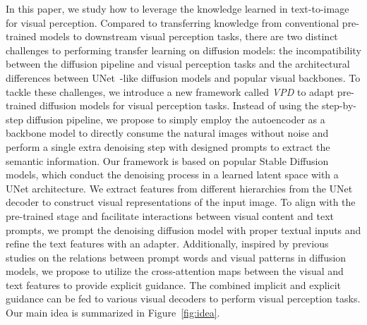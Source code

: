 \documentclass[10pt,twocolumn,letterpaper]{article}
\begin{document}
In this paper, we study how to leverage the knowledge learned in text-to-image for visual perception. Compared to transferring knowledge from conventional pre-trained models to downstream visual perception tasks, there are two distinct challenges to performing transfer learning on diffusion models:  the incompatibility between the diffusion pipeline and visual perception tasks and the architectural differences between UNet~\cite{ronneberger2015unet}-like diffusion models and popular visual backbones. To tackle these challenges, we introduce a new framework called \emph{VPD} to adapt pre-trained diffusion models for visual perception tasks.  Instead of using the step-by-step diffusion pipeline, we propose to simply employ the autoencoder as a backbone model to directly consume the natural images without noise and perform a single extra denoising step with designed prompts to extract the semantic information. Our framework is based on popular Stable Diffusion~\cite{rombach2022high} models, which conduct the denoising process in a learned latent space with a UNet architecture.  We  extract features from different hierarchies from the UNet decoder to construct visual representations of the input image. To align with the pre-trained stage and facilitate interactions between visual content and text prompts, we  prompt the denoising diffusion model with proper textual inputs and refine the text features with an adapter. Additionally, inspired by previous studies on the relations between prompt words and visual patterns in diffusion models, we propose to utilize the cross-attention maps between the visual and text features to provide explicit guidance. The combined implicit and explicit guidance can be fed to various visual decoders to perform visual perception tasks.   Our main idea is summarized in Figure~\ref{fig:idea}.
\end{document}
